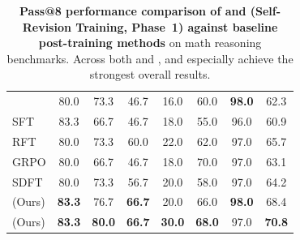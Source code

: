 \begin{table}[h]
\begin{tabular}{lccccccc}
\textbf{\olmo{}}           & 80.0          & 73.3          & 46.7          & 16.0          & 60.0          & \textbf{98.0} & 62.3          \\
SFT                        & 83.3          & 66.7          & 46.7          & 18.0          & 55.0          & 96.0          & 60.9          \\
RFT                        & 80.0          & 73.3          & 60.0          & 22.0          & 62.0          & 97.0          & 65.7          \\
GRPO                       & 80.0          & 66.7          & 46.7          & 18.0          & 70.0          & 97.0          & 63.1          \\
SDFT                       & 80.0          & 73.3          & 56.7          & 20.0          & 58.0          & 97.0          & 64.2          \\
\textbf{\sft{}} (Ours)     & \textbf{83.3} & 76.7          & \textbf{66.7} & 20.0          & 66.0          & \textbf{98.0} & 68.4          \\
\textbf{\ours{}} (Ours)    & \textbf{83.3} & \textbf{80.0} & \textbf{66.7} & \textbf{30.0} & \textbf{68.0} & 97.0          & \textbf{70.8} \\
\bottomrule
\end{tabular}
\caption{\textbf{Pass@8 performance comparison of \ours{} and \sft{} (Self-Revision Training, Phase~1) against baseline post-training methods} on math reasoning benchmarks. Across both \qwen{} and \olmo{}, \sft{} and especially \ours{} achieve the strongest overall results.}
\label{tab:pass8_results}
\end{table}